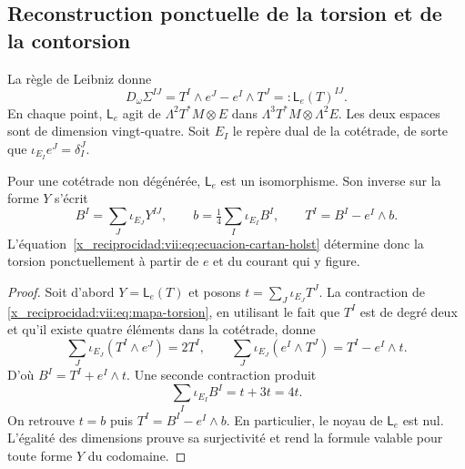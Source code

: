 \begin{HMTCompactSection}
\section{Reconstruction ponctuelle de la torsion et de la contorsion}
\label{x_reciprocidad:vii:subsec:reconstruccion-torsion}

La règle de Leibniz donne
\begin{equation}
 D_\omega\Sigma^{IJ}
 =T^I\wedge e^J-e^I\wedge T^J
 =:\mathsf L_e(T)^{IJ}.
 \label{x_reciprocidad:vii:eq:mapa-torsion}
\end{equation}
En chaque point, \(\mathsf L_e\) agit de \(\Lambda^2T^*M\otimes E\) dans \(\Lambda^3T^*M\otimes\Lambda^2E\). Les deux espaces sont de dimension vingt-quatre. Soit \(E_I\) le repère dual de la cotétrade, de sorte que \(\iota_{E_I}e^J=\delta_I^J\).

\begin{theorem}
\label{x_reciprocidad:vii:thm:inversion-torsion}
Pour une cotétrade non dégénérée, \(\mathsf L_e\) est un isomorphisme.
Son inverse sur la forme \(Y\) s'écrit
\begin{equation}
 B^I=\sum_J\iota_{E_J}Y^{IJ},\qquad
 b=\tfrac14\sum_I\iota_{E_I}B^I,\qquad
 T^I=B^I-e^I\wedge b.
 \label{x_reciprocidad:vii:eq:torsion-explicita}
\end{equation}
L'équation~\eqref{x_reciprocidad:vii:eq:ecuacion-cartan-holst} détermine donc
la torsion ponctuellement à partir de \(e\) et du courant qui y
figure.
\end{theorem}
\begin{proof}
Soit d'abord \(Y=\mathsf L_e(T)\) et posons
\(t=\sum_J\iota_{E_J}T^J\). La contraction de
\eqref{x_reciprocidad:vii:eq:mapa-torsion}, en utilisant le fait que \(T^I\) est de degré deux
et qu'il existe quatre éléments dans la cotétrade, donne
\[
 \sum_J\iota_{E_J}(T^I\wedge e^J)=2T^I,
 \qquad
 \sum_J\iota_{E_J}(e^I\wedge T^J)=T^I-e^I\wedge t.
\]
D'où \(B^I=T^I+e^I\wedge t\). Une seconde contraction produit
\[
 \sum_I\iota_{E_I}B^I=t+3t=4t.
\]
On retrouve \(t=b\) puis \(T^I=B^I-e^I\wedge b\).
En particulier, le noyau de \(\mathsf L_e\) est nul. L'égalité
des dimensions prouve sa surjectivité et rend la formule valable
pour toute forme \(Y\) du codomaine.
\end{proof}


\end{HMTCompactSection}
